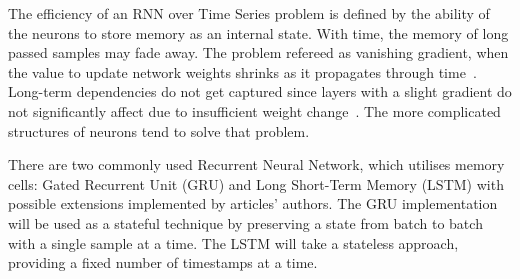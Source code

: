 %
The efficiency of an RNN over Time Series problem is defined by the ability of the neurons to store memory as an internal state.
With time, the memory of long passed samples may fade away. The problem refereed as vanishing gradient, when the value to update network weights shrinks as it propagates through time~\cite{rasifaghihi_predictive_2020}.
Long-term dependencies do not get captured since layers with a slight gradient do not significantly affect due to insufficient weight change~\cite{rasifaghihi_predictive_2020,hochreiter_vanishing_1998}.
The more complicated structures of neurons tend to solve that problem.

%
%
There are two commonly used Recurrent Neural Network, which utilises memory cells: Gated Recurrent Unit (GRU) and Long Short-Term Memory (LSTM) with possible extensions implemented by articles' authors.
The GRU implementation will be used as a stateful technique by preserving a state from batch to batch with a single sample at a time.
The LSTM will take a stateless approach, providing a fixed number of timestamps at a time.


